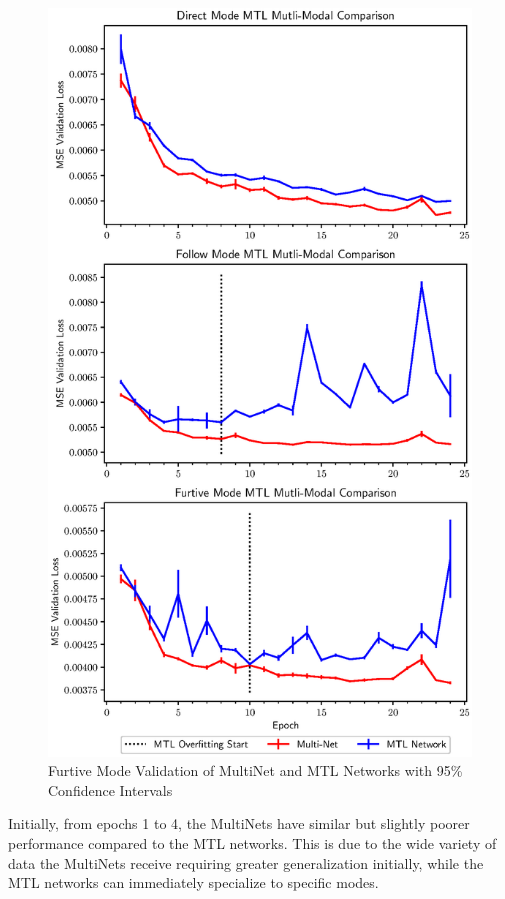 \begin{figure}[t]
\centering
\includegraphics[width=\linewidth]{paper/content/images/individual_new}
\caption{Furtive Mode Validation of MultiNet and MTL Networks with 95\% Confidence Intervals}

\label{fig:furtivegraph}
\end{figure}

Initially, from epochs 1 to 4, the MultiNets have similar but slightly poorer performance compared to the MTL networks. This is due to the wide variety of data the MultiNets receive requiring greater generalization initially, while the MTL networks can immediately specialize to specific modes.

